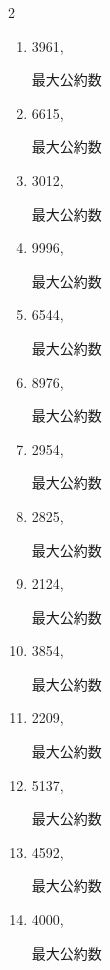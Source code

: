 \begin{multicols}{2}
\begin{enumerate}
  \item 3961,

        最大公約数

  \item 6615,

        最大公約数

  \item 3012,

        最大公約数

  \item 9996,

        最大公約数

\columnbreak %

\resetques

  \item 6544,

        最大公約数

  \item 8976,

        最大公約数

  \item 2954,

        最大公約数

  \item 2825,

        最大公約数

  \item 2124,

        最大公約数

\columnbreak %

  \item 3854,

        最大公約数

  \item 2209,

        最大公約数

  \item 5137,

        最大公約数

  \item 4592,

        最大公約数

  \item 4000,

        最大公約数

\end{enumerate}
\end{multicols}
